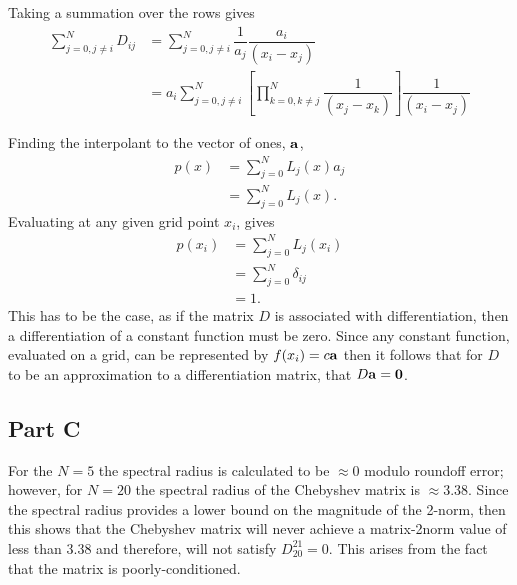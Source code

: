 \documentclass[12pt]{article}
\begin{document}
Taking a summation over the rows gives
\begin{subequations}
    \begin{align}
        \sum\limits_{j=0, j\neq i}^{N} D_{ij} &= \sum\limits_{j=0, j\neq i}^{N}\dfrac{1}{a_{j}}\dfrac{a_{i}}{(x_{i}-x_{j})}\\
        &= a_{i}\sum\limits_{j=0, j\neq i}^{N}\left[\prod_{k=0,k\neq j}^{N}\dfrac{1}{(x_{j}-x_{k})}\right]\dfrac{1}{(x_{i}-x_{j})}
    \end{align}
\end{subequations}

Finding the interpolant to the vector of ones, $\vb{a}$,
\begin{subequations}
    \begin{align}
        p(x) &= \sum_{j=0}^{N} L_{j}(x)a_{j}\\
        &= \sum_{j=0}^{N} L_{j}(x).
    \end{align}
\end{subequations}
Evaluating at any given grid point $x_{i}$, gives 
\begin{subequations}
    \begin{align}
        p(x_{i}) &= \sum_{j=0}^{N} L_{j}(x_{i})\\
        &= \sum_{j=0}^{N} \delta_{ij}\\
        &= 1.
    \end{align}
\end{subequations}
This has to be the case, as if the matrix $D$ is associated with differentiation, then a differentiation of a constant function must be zero.
Since any constant function, evaluated on a grid, can be represented by $f(x_{i}) = c\vb{a}$ then it follows that for $D$ to be an approximation to a differentiation matrix, that $D\vb{a} = \vb{0}$.

\subsection*{Part C}

For the $N = 5$ the spectral radius is calculated to be $\approx 0$ modulo roundoff error; however, for $N=20$ the spectral radius of the Chebyshev matrix is $\approx 3.38$. Since the spectral radius provides a lower bound on the magnitude of the 2-norm, then this shows that the Chebyshev matrix will never achieve a matrix-2norm value of less than $3.38$ and therefore, will not satisfy $D_{20}^{21} = 0$. 
This arises from the fact that the matrix is poorly-conditioned.
\end{document}

